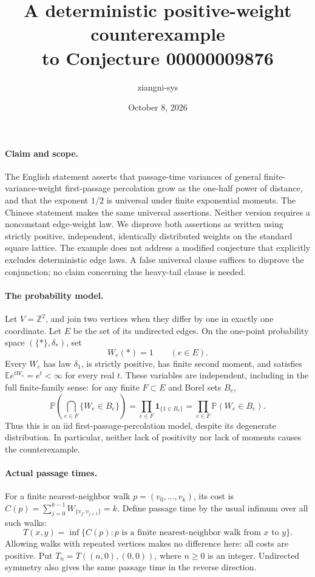 \documentclass[11pt]{article}
\title{A deterministic positive-weight counterexample\\to Conjecture 00000009876}
\author{ziangni-sys}
\date{October 8, 2026}
\begin{document}
\maketitle

\paragraph{Claim and scope.}
The English statement asserts that passage-time variances of general
finite-variance-weight first-passage percolation grow as the one-half power
of distance, and that the exponent $1/2$ is universal under finite
exponential moments. The Chinese statement makes the same universal
assertions. Neither version requires a nonconstant edge-weight law.
We disprove both assertions as written using strictly positive,
independent, identically distributed weights on the standard square lattice.
The example does not address a modified conjecture that explicitly excludes
deterministic edge laws. A false universal clause suffices to disprove the
conjunction; no claim concerning the heavy-tail clause is needed.

\paragraph{The probability model.}
Let $V=\mathbb Z^2$, and join two vertices when they differ by one in exactly
one coordinate. Let $E$ be the set of its undirected edges. On the one-point
probability space $(\{*\},\delta_*)$, set
\[
             W_e(*)=1 \qquad(e\in E).
\]
Every $W_e$ has law $\delta_1$, is strictly positive, has finite second moment,
and satisfies $\mathbb E e^{tW_e}=e^t<\infty$ for every real $t$.
These variables are independent, including in the full finite-family sense:
for any finite $F\subset E$ and Borel sets $B_e$,
\[
 \mathbb P\left(\bigcap_{e\in F}\{W_e\in B_e\}\right)
 =\prod_{e\in F}\mathbf1_{\{1\in B_e\}}
 =\prod_{e\in F}\mathbb P(W_e\in B_e).
\]
Thus this is an iid first-passage-percolation model, despite its degenerate
distribution. In particular, neither lack of positivity nor lack of moments
causes the counterexample.

\paragraph{Actual passage times.}
For a finite nearest-neighbor walk $p=(v_0,\ldots,v_k)$, its cost is
$C(p)=\sum_{j=0}^{k-1}W_{\{v_j,v_{j+1}\}}=k$.
Define passage time by the usual infimum over all such walks:
\[
 T(x,y)=\inf\{C(p):p\text{ is a finite nearest-neighbor walk from }x\text{ to }y\}.
\]
Allowing walks with repeated vertices makes no difference here: all costs
are positive. Put $T_n=T((n,0),(0,0))$, where $n\geq0$ is an integer.
Undirected symmetry also gives the same passage time in the reverse direction.
\end{document}
